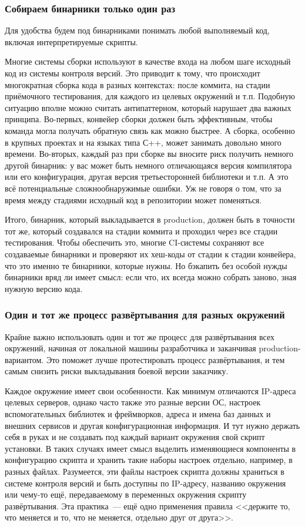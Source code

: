 \documentclass{../../text-style}
\begin{document}
\subsubsection{Собираем бинарники только один раз}

Для удобства будем под бинарниками понимать любой выполняемый код, включая интерпретируемые скрипты.

Многие системы сборки используют в качестве входа на любом шаге исходный код из системы контроля версий. Это приводит к тому, что происходит многократная сборка кода в разных контекстах: после коммита, на стадии приёмочного тестирования, для каждого из целевых окружений и т.п. Подобную ситуацию вполне можно считать антипаттерном, который нарушает два важных принципа. Во-первых, конвейер сборки должен быть эффективным, чтобы команда могла получать обратную связь как можно быстрее. А сборка, особенно в крупных проектах и на языках типа С++, может занимать довольно много времени. Во-вторых, каждый раз при сборке вы вносите риск получить немного другой бинарник: у вас может быть немного отличающаяся версия компилятора или его конфигурация, другая версия третьесторонней библиотеки и т.п. А это всё потенциальные сложнообнаружимые ошибки. Уж не говоря о том, что за время между стадиями исходный код в репозитории может поменяться.

Итого, бинарник, который выкладывается в production, должен быть в точности тот же, который создавался на стадии коммита и проходил через все стадии тестирования. Чтобы обеспечить это, многие CI-системы сохраняют все создаваемые бинарники и проверяют их хеш-коды от стадии к стадии конвейера, что это именно те бинарники, которые нужны. Но бэкапить без особой нужды бинарники вряд ли имеет смысл: если что, их всегда можно собрать заново, зная нужную версию кода.

\subsubsection{Один и тот же процесс развёртывания для разных окружений}

Крайне важно использовать один и тот же процесс для развёртывания всех окружений, начиная от локальной машины разработчика и заканчивая production-вариантом. Это поможет лучше протестировать процесс развёртывания, и тем самым снизить риски выкладывания боевой версии заказчику.

Каждое окружение имеет свои особенности. Как минимум отличаются IP-адреса целевых серверов, однако часто также это разные версии ОС, настроек вспомогательных библиотек и фреймворков, адреса и имена баз данных и внешних сервисов и другая конфигурационная информация. И тут нужно держать себя в руках и не создавать под каждый вариант окружения свой скрипт установки. В таких случаях имеет смысл выделить изменяющиеся компоненты в конфигурацию скрипта и хранить такие наборы настроек отдельно, например, в разных файлах. Разумеется, эти файлы настроек скрипта должны храниться в системе контроля версий и быть доступны по IP-адресу, названию окружения или чему-то ещё, передаваемому в переменных окружения скрипту развёртывания. Эта практика~--- ещё одно применения правила <<держите то, что меняется и то, что не меняется, отдельно друг от друга>>.
\end{document}
